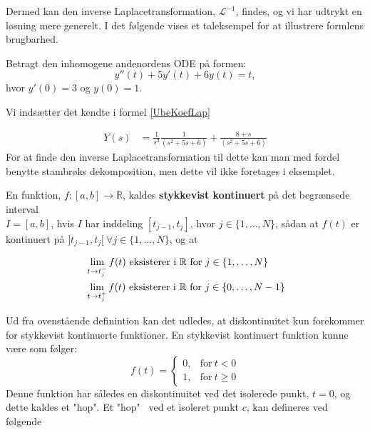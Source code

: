Dermed kan den inverse Laplacetransformation, $\mathcal{L}^{-1}$, findes, og vi har udtrykt en løsning mere generelt. I det følgende vises et taleksempel for at illustrere formlens brugbarhed.

\begin{Example}
\textnormal{Betragt den inhomogene andenordens ODE på formen:}
$$ y''(t) + 5y'(t) + 6y(t) = t,$$
\textnormal{hvor $y'(0) = 3$ og $y(0) = 1$.}
\hfill \break

\textnormal{Vi indsætter det kendte i formel \eqref{UbeKoefLap}}
\hfill \break

\begin{align*}
        Y(s) &= \frac{1}{s^2}\frac{1}{(s^2 + 5s + 6)} + \frac{8 + s}{(s^2 + 5s + 6)}
\end{align*}
\textnormal{For at finde den inverse Laplacetransformation til dette kan man med fordel benytte stambrøks dekomposition, men dette vil ikke foretages i eksemplet.}
\end{Example}

\begin{definition}\label{StykKont}
En funktion, $f:[a,b]\to \mathbb{R}$, kaldes \textbf{stykkevist kontinuert} på det begrænsede interval \\ $I = [a,b]$, hvis $I$ har inddeling $[t_{j-1},t_j]$, hvor $j \in \{1,\hdots, N\}$, sådan at $f(t)$ er kontinuert på $]t_{j-1},t_j[\ \forall j\in\{1,\hdots,N\}$, og at

\begin{align*}
    &\lim_{t \to t_j^{-}}f(t) \textnormal{ eksisterer i }  \mathbb{R} \textnormal{ for } j \in \{1, \hdots, N\}\\
    &\lim_{t \to t_j^{+}}f(t) \textnormal{ eksisterer i } \mathbb{R} \textnormal{ for } j \in \{0, \hdots, N-1\}
\end{align*}

\end{definition}
Ud fra ovenstående definintion kan det udledes, at diskontinuitet kun forekommer for stykkevist kontinuerte funktioner. En stykkevist kontinuert funktion kunne være som følger:
  \begin{equation}
    f(t)=
    \begin{cases}
      0, & \text{for}\ t < 0 \\
      1, & \text{for}\ t \geq 0
    \end{cases}
  \end{equation}
Denne funktion har således en diskontinuitet ved det isolerede punkt, $t = 0$, og dette kaldes et "hop".
Et "hop" \ ved et isoleret punkt $c$, kan defineres ved følgende


